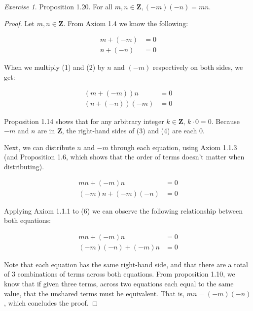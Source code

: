\documentclass[12pt,oneside]{amsart}
\theoremstyle{remark}
\newtheorem{exer}{Exercise}
\begin{document}
\newpage
\begin{exer}

Proposition 1.20. For all $m,n \in \mathbf{Z}, (-m)(-n) = mn$.
\end{exer}

\begin{proof}
Let $m,n \in \mathbf{Z}$. From Axiom 1.4 we know the following:

\begin{align}
m + (-m) &= 0 \\
n + (-n) &= 0
\end{align}

When we multiply (1) and (2) by $n$ and $(-m)$ respectively on both sides, we get:

\begin{align}
(m + (-m))n    &= 0 \\
(n + (-n))(-m) &= 0
\end{align}

Proposition 1.14 shows that for any arbitrary integer $k \in \mathbf{Z}$, $k \cdot 0 = 0$. Because $-m$ and $n$ are in $\mathbf{Z}$, the right-hand sides of (3) and (4) are each 0.

Next, we can distribute $n$ and $-m$ through each equation, using Axiom 1.1.3 (and Proposition 1.6, which shows that the order of terms doesn't matter when distributing).

\begin{align}
mn + (-m)n &= 0 \\
(-m)n + (-m)(-n) &= 0
\end{align}

Applying Axiom 1.1.1 to (6) we can observe the following relationship between both equations:

\begin{align}
mn + (-m)n &= 0 \\
(-m)(-n) + (-m)n &= 0
\end{align}

Note that each equation has the same right-hand side, and that there are a total of 3 combinations of terms across both equations. From proposition 1.10, we know that if given three terms, across two equations each equal to the same value, that the unshared terms must be equivalent. That is, $mn = (-m)(-n)$, which concludes the proof.

\end{proof}
\end{document}
